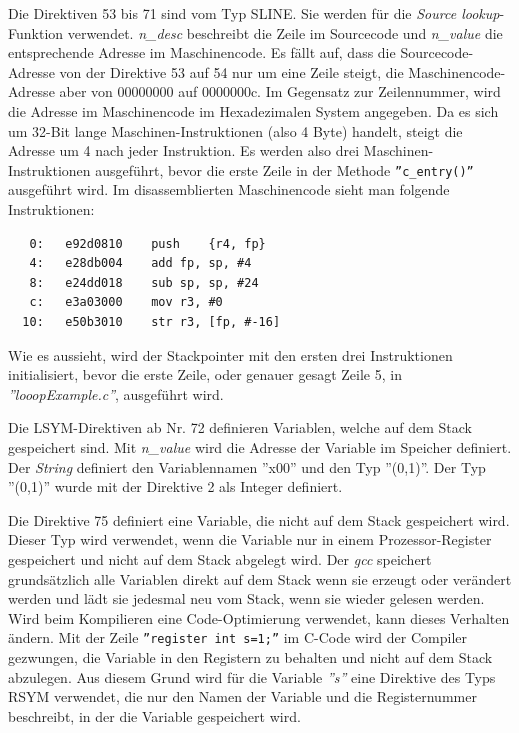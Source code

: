 Die Direktiven 53 bis 71 sind vom Typ SLINE.
Sie werden für die \textit{Source lookup}-Funktion verwendet.
\textit{n\_desc} beschreibt die Zeile im Sourcecode und \textit{n\_value} die entsprechende Adresse im Maschinencode.
Es fällt auf, dass die Sourcecode-Adresse von der Direktive 53 auf 54 nur um eine Zeile steigt, die Maschinencode-Adresse aber von 00000000 auf 0000000c.
Im Gegensatz zur Zeilennummer, wird die Adresse im Maschinencode im Hexadezimalen System angegeben.
Da es sich um 32-Bit lange Maschinen-Instruktionen (also 4 Byte) handelt, steigt die Adresse um 4 nach jeder Instruktion.
Es werden also drei Maschinen-Instruktionen ausgeführt, bevor die erste Zeile in der Methode \texttt{''c\_entry()''} ausgeführt wird.
Im disassemblierten Maschinencode sieht man folgende Instruktionen:
\lstset{language=plain}
\begin{lstlisting}
   0:	e92d0810 	push	{r4, fp}
   4:	e28db004 	add	fp, sp, #4
   8:	e24dd018 	sub	sp, sp, #24
   c:	e3a03000 	mov	r3, #0
  10:	e50b3010 	str	r3, [fp, #-16]
\end{lstlisting}

Wie es aussieht, wird der Stackpointer mit den ersten drei Instruktionen initialisiert, bevor die erste Zeile, oder genauer gesagt Zeile 5, in \textit{''looopExample.c''}, ausgeführt wird.

Die LSYM-Direktiven ab Nr. 72 definieren Variablen, welche auf dem Stack gespeichert sind.
Mit \textit{n\_value} wird die Adresse der Variable im Speicher definiert.
Der \textit{String} definiert den Variablennamen ''x00'' und den Typ ''(0,1)''.
Der Typ ''(0,1)'' wurde mit der Direktive 2 als Integer definiert.

Die Direktive 75 definiert eine Variable, die nicht auf dem Stack gespeichert wird.
Dieser Typ wird verwendet, wenn die Variable nur in einem Prozessor-Register gespeichert und nicht auf dem Stack abgelegt wird.
Der \textit{gcc} speichert grundsätzlich alle Variablen direkt auf dem Stack wenn sie erzeugt oder verändert werden und lädt sie jedesmal neu vom Stack, wenn sie wieder gelesen werden.
Wird beim Kompilieren eine Code-Optimierung verwendet, kann dieses Verhalten ändern.
Mit der Zeile \texttt{{''register int s=1;''}} im C-Code wird der Compiler gezwungen, die Variable in den Registern zu behalten und nicht auf dem Stack abzulegen.
Aus diesem Grund wird für die Variable \textit{''s''} eine Direktive des Typs RSYM verwendet, die nur den Namen der Variable und die Registernummer beschreibt, in der die Variable gespeichert wird.

